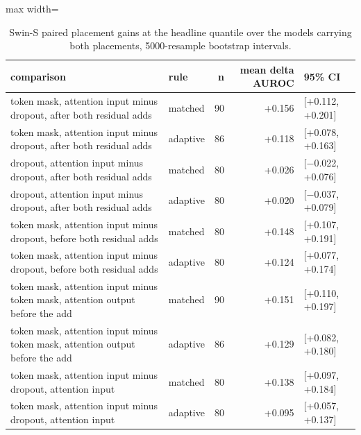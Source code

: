 \begin{table}[htbp]
\centering
\small
\caption{Swin-S paired placement gains at the headline quantile over the models carrying both placements, 5000-resample bootstrap intervals.}
\label{tab:swin-gains}
\begin{adjustbox}{max width=\linewidth}
\begin{tabular}{llrrl}
\toprule
comparison & rule & n & mean delta AUROC & 95\% CI \\
\midrule
token mask, attention input minus dropout, after both residual adds & matched & 90 & +0.156 & [+0.112, +0.201] \\
token mask, attention input minus dropout, after both residual adds & adaptive & 86 & +0.118 & [+0.078, +0.163] \\
dropout, attention input minus dropout, after both residual adds & matched & 80 & +0.026 & [$-$0.022, +0.076] \\
dropout, attention input minus dropout, after both residual adds & adaptive & 80 & +0.020 & [$-$0.037, +0.079] \\
token mask, attention input minus dropout, before both residual adds & matched & 80 & +0.148 & [+0.107, +0.191] \\
token mask, attention input minus dropout, before both residual adds & adaptive & 80 & +0.124 & [+0.077, +0.174] \\
token mask, attention input minus token mask, attention output before the add & matched & 90 & +0.151 & [+0.110, +0.197] \\
token mask, attention input minus token mask, attention output before the add & adaptive & 86 & +0.129 & [+0.082, +0.180] \\
token mask, attention input minus dropout, attention input & matched & 80 & +0.138 & [+0.097, +0.184] \\
token mask, attention input minus dropout, attention input & adaptive & 80 & +0.095 & [+0.057, +0.137] \\
\bottomrule
\end{tabular}
\end{adjustbox}
\end{table}
